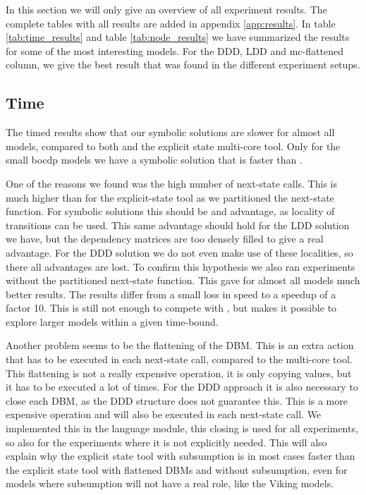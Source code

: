 In this section we will only give an overview of all experiment results. The complete tables with all results are added in appendix \ref{app:results}. In table \ref{tab:time_results} and table \ref{tab:node_results} we have summarized the results for some of the most interesting models. For the DDD, LDD and mc-flattened column, we give the best result that was found in the different experiment setups. 

\subsection{Time}
The timed results show that our symbolic solutions are slower for almost all models, compared to both \uppaal{} and the explicit state multi-core tool. Only for the small bocdp models we have a symbolic solution that is faster than \uppaal{}. 

One of the reasons we found was the high number of next-state calls. This is much higher than for the explicit-state tool as we partitioned the next-state function. For symbolic solutions this should be and advantage, as locality of transitions can be used. This same advantage should hold for the LDD solution we have, but the dependency matrices are too densely filled to give a real advantage. For the DDD solution we do not even make use of these localities, so there all advantages are lost. To confirm this hypothesis we also ran experiments without the partitioned next-state function. This gave for almost all models much better results. The results differ from a small loss in speed to a speedup of a factor 10. This is still not enough to compete with \uppaal{}, but makes it possible to explore larger models within a given time-bound. 

Another problem seems to be the flattening of the DBM. This is an extra action that has to be executed in each next-state call, compared to the multi-core tool. This flattening is not a really expensive operation, it is only copying values, but it has to be executed a lot of times. For the DDD approach it is also necessary to close each DBM, as the DDD structure does not guarantee this. This is a more expensive operation and will also be executed in each next-state call. We implemented this in the language module, this closing is used for all experiments, so also for the experiments where it is not explicitly needed. This will also explain why the explicit state tool with subsumption is in most cases faster than the explicit state tool with flattened DBMs and without subsumption, even for models where subsumption will not have a real role, like the Viking models.

